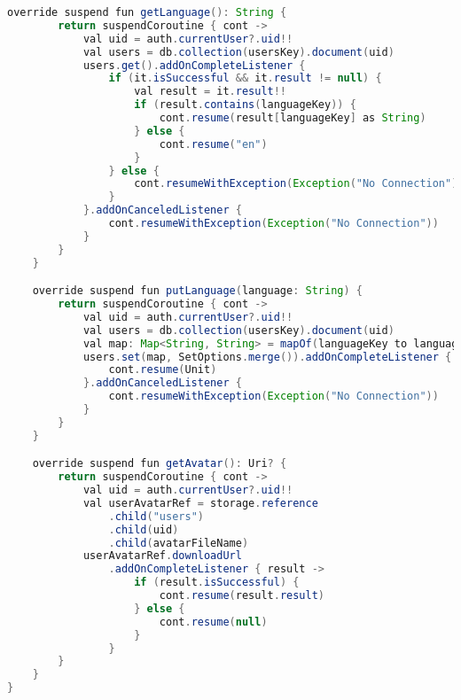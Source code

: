\begin{lstlisting}[language=Java,label={lst:add:firebase}]
    override suspend fun getLanguage(): String {
        return suspendCoroutine { cont ->
            val uid = auth.currentUser?.uid!!
            val users = db.collection(usersKey).document(uid)
            users.get().addOnCompleteListener {
                if (it.isSuccessful && it.result != null) {
                    val result = it.result!!
                    if (result.contains(languageKey)) {
                        cont.resume(result[languageKey] as String)
                    } else {
                        cont.resume("en")
                    }
                } else {
                    cont.resumeWithException(Exception("No Connection"))
                }
            }.addOnCanceledListener {
                cont.resumeWithException(Exception("No Connection"))
            }
        }
    }

    override suspend fun putLanguage(language: String) {
        return suspendCoroutine { cont ->
            val uid = auth.currentUser?.uid!!
            val users = db.collection(usersKey).document(uid)
            val map: Map<String, String> = mapOf(languageKey to language)
            users.set(map, SetOptions.merge()).addOnCompleteListener {
                cont.resume(Unit)
            }.addOnCanceledListener {
                cont.resumeWithException(Exception("No Connection"))
            }
        }
    }

    override suspend fun getAvatar(): Uri? {
        return suspendCoroutine { cont ->
            val uid = auth.currentUser?.uid!!
            val userAvatarRef = storage.reference
                .child("users")
                .child(uid)
                .child(avatarFileName)
            userAvatarRef.downloadUrl
                .addOnCompleteListener { result ->
                    if (result.isSuccessful) {
                        cont.resume(result.result)
                    } else {
                        cont.resume(null)
                    }
                }
        }
    }
}
\end{lstlisting}
